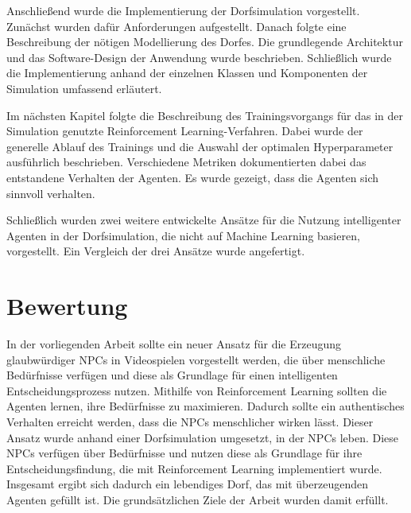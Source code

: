 Anschließend wurde die Implementierung der Dorfsimulation vorgestellt. Zunächst wurden dafür Anforderungen aufgestellt. Danach folgte eine Beschreibung der nötigen Modellierung des Dorfes. Die grundlegende Architektur und das Software-Design der Anwendung wurde beschrieben. Schließlich wurde die Implementierung anhand der einzelnen Klassen und Komponenten der Simulation umfassend erläutert.

Im nächsten Kapitel folgte die Beschreibung des Trainingsvorgangs für das in der Simulation genutzte Reinforcement Learning-Verfahren. Dabei wurde der generelle Ablauf des Trainings und die Auswahl der optimalen Hyperparameter ausführlich beschrieben. Verschiedene Metriken dokumentierten dabei das entstandene Verhalten der Agenten. Es wurde gezeigt, dass die Agenten sich sinnvoll verhalten.

Schließlich wurden zwei weitere entwickelte Ansätze für die Nutzung intelligenter Agenten in der Dorfsimulation, die nicht auf Machine Learning basieren, vorgestellt. Ein Vergleich der drei Ansätze wurde angefertigt.















\section{Bewertung}
In der vorliegenden Arbeit sollte ein neuer Ansatz für die Erzeugung glaubwürdiger NPCs in Videospielen vorgestellt werden, die über menschliche Bedürfnisse verfügen und diese als Grundlage für einen intelligenten Entscheidungsprozess nutzen. Mithilfe von Reinforcement Learning sollten die Agenten lernen, ihre Bedürfnisse zu maximieren. Dadurch sollte ein authentisches Verhalten erreicht werden, dass die NPCs menschlicher wirken lässt.
Dieser Ansatz wurde anhand einer Dorfsimulation umgesetzt, in der NPCs leben. Diese NPCs verfügen über Bedürfnisse und nutzen diese als Grundlage für ihre Entscheidungsfindung, die mit Reinforcement Learning implementiert wurde. Insgesamt ergibt sich dadurch ein lebendiges Dorf, das mit überzeugenden Agenten gefüllt ist. Die grundsätzlichen Ziele der Arbeit wurden damit erfüllt. 


